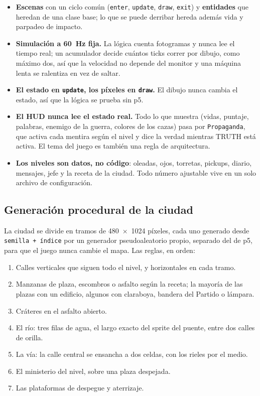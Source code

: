 \documentclass[11pt,a4paper]{article}
\begin{document}
\begin{itemize}
  \item \textbf{Escenas} con un ciclo común (\texttt{enter}, \texttt{update}, \texttt{draw}, \texttt{exit}) y \textbf{entidades} que heredan de una clase base; lo que se puede derribar hereda además vida y parpadeo de impacto.
  \item \textbf{Simulación a 60~Hz fija.} La lógica cuenta fotogramas y nunca lee el tiempo real; un acumulador decide cuántos ticks correr por dibujo, como máximo dos, así que la velocidad no depende del monitor y una máquina lenta se ralentiza en vez de saltar.
  \item \textbf{El estado en \texttt{update}, los píxeles en \texttt{draw}.} El dibujo nunca cambia el estado, así que la lógica se prueba sin p5.
  \item \textbf{El HUD nunca lee el estado real.} Todo lo que muestra (vidas, puntaje, palabras, enemigo de la guerra, colores de los cazas) pasa por \texttt{Propaganda}, que activa cada mentira según el nivel y dice la verdad mientras TRUTH está activa. El tema del juego es también una regla de arquitectura.
  \item \textbf{Los niveles son datos, no código}: oleadas, ojos, torretas, pickups, diario, mensajes, jefe y la receta de la ciudad. Todo número ajustable vive en un solo archivo de configuración.
\end{itemize}

\subsection{Generación procedural de la ciudad}

La ciudad se divide en tramos de 480~×~1024 píxeles, cada uno generado desde \texttt{semilla + índice} por un generador pseudoaleatorio propio, separado del de p5, para que el juego nunca cambie el mapa. Las reglas, en orden:

\begin{enumerate}
  \item Calles verticales que siguen todo el nivel, y horizontales en cada tramo.
  \item Manzanas de plaza, escombros o asfalto según la receta; la mayoría de las plazas con un edificio, algunos con claraboya, bandera del Partido o lámpara.
  \item Cráteres en el asfalto abierto.
  \item El río: tres filas de agua, el largo exacto del sprite del puente, entre dos calles de orilla.
  \item La vía: la calle central se ensancha a dos celdas, con los rieles por el medio.
  \item El ministerio del nivel, sobre una plaza despejada.
  \item Las plataformas de despegue y aterrizaje.
\end{enumerate}
\end{document}
